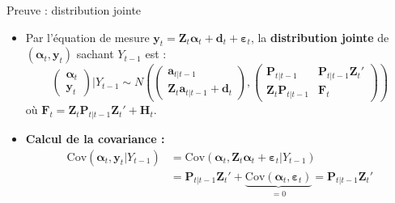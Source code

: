\documentclass[11pt,aspectratio=169]{beamer}
\newcommand{\Cov}{\mathrm{Cov}}
\begin{document}
\begin{frame}{Preuve : distribution jointe}

\begin{itemize}

\item Par l'équation de mesure $\bm{y}_t = \bm{Z}_t \bm{\alpha}_t + \bm{d}_t + \bm{\varepsilon}_t$, la \textbf{distribution jointe} de $(\bm{\alpha}_t, \bm{y}_t)$ sachant $Y_{t-1}$ est :
  \[
  \begin{pmatrix} \bm{\alpha}_t \\ \bm{y}_t \end{pmatrix} \bigg| Y_{t-1} \sim N\!\left( \begin{pmatrix} \bm{a}_{t|t-1} \\ \bm{Z}_t \bm{a}_{t|t-1} + \bm{d}_t \end{pmatrix}, \begin{pmatrix} \bm{P}_{t|t-1} & \bm{P}_{t|t-1} \bm{Z}_t' \\ \bm{Z}_t \bm{P}_{t|t-1} & \bm{F}_t \end{pmatrix} \right)
  \]
  où $\bm{F}_t = \bm{Z}_t \bm{P}_{t|t-1} \bm{Z}_t' + \bm{H}_t$.\newline

\item \textbf{Calcul de la covariance :}
  \begin{align*}
  \Cov(\bm{\alpha}_t, \bm{y}_t | Y_{t-1}) &= \Cov(\bm{\alpha}_t, \bm{Z}_t \bm{\alpha}_t + \bm{\varepsilon}_t | Y_{t-1}) \\
  &= \bm{P}_{t|t-1} \bm{Z}_t' + \underbrace{\Cov(\bm{\alpha}_t, \bm{\varepsilon}_t)}_{= 0} = \bm{P}_{t|t-1} \bm{Z}_t'
  \end{align*}

\end{itemize}

\end{frame}
\end{document}
